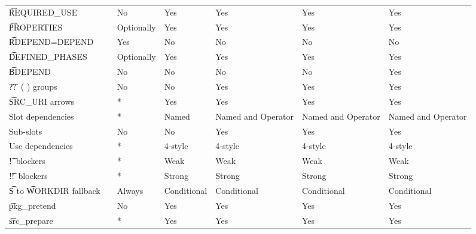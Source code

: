 \begin{landscape}
\begin{longtable}{llP{7.5em}P{7.5em}P{7.5em}P{7.5em}P{7.5em}}
\t{REQUIRED_USE} &  &
    No & Yes & Yes & Yes & Yes \\

\t{PROPERTIES} &  &
    Optionally & Yes & Yes & Yes & Yes \\

\t{RDEPEND=DEPEND} &  &
    Yes & No & No & No & No \\

\t{DEFINED_PHASES} &  &
    Optionally & Yes & Yes & Yes & Yes \\

\t{BDEPEND} &  &
    No & No & No & No & Yes \\

\t{??\ ( )} groups &  &
    No & No & Yes & Yes & Yes \\

\t{SRC_URI} arrows &  &
    * & Yes & Yes & Yes & Yes \\

Slot dependencies &  &
    * & Named & Named and Operator & Named and Operator & Named and Operator \\

Sub-slots &  &
    No & No & Yes & Yes & Yes \\

Use dependencies &  &
    * & 4-style & 4-style & 4-style & 4-style \\

\t{!}\ blockers &  &
    * & Weak & Weak & Weak & Weak \\

\t{!!}\ blockers &  &
    * & Strong & Strong & Strong & Strong \\

\t{S} to \t{WORKDIR} fallback &  &
    Always & Conditional & Conditional & Conditional & Conditional \\

\t{pkg_pretend} &  &
    No & Yes & Yes & Yes & Yes \\

\t{src_prepare} &  &
    * & Yes & Yes & Yes & Yes \\


\end{longtable}
\end{landscape}
